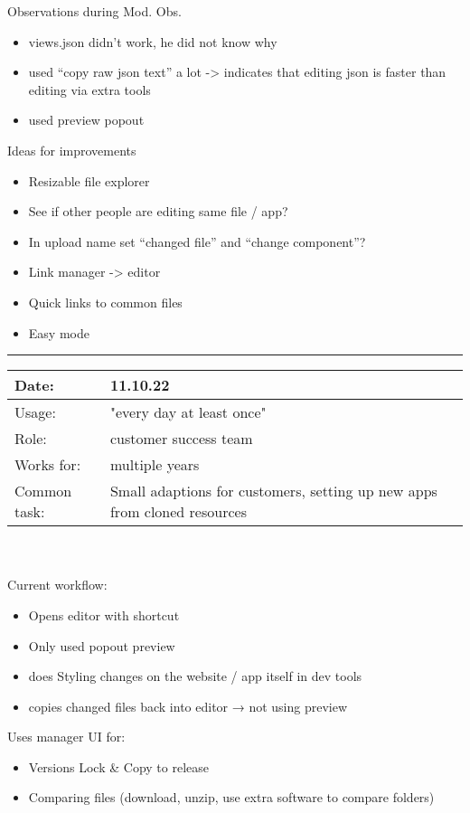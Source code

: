 Observations during Mod. Obs.
\begin{itemize}[nosep]
  \item views.json didn't work, he did not know why
  \item used “copy raw json text” a lot -> indicates that editing json is faster than editing via extra tools
  \item used preview popout
\end{itemize}

Ideas for improvements
\begin{itemize}[nosep]
  \item Resizable file explorer
  \item See if other people are editing same file / app?
  \item In upload name set “changed file” and “change component”?
  \item Link manager -> editor
  \item Quick links to common files
  \item Easy mode
\end{itemize}
\bigskip
\hrule

\begin{tabularx}{\linewidth}{lX}
  Date: & 11.10.22 \\
  \hline
  Usage: & "every day at least once"\\
  \hline
  Role: & customer success team \\
  \hline
  Works for: & multiple years \\
  \hline
  Common task: &  Small adaptions for customers, setting up new apps from cloned resources
\end{tabularx}
\\\\


Current workflow:
\begin{itemize}[nosep]
  \item Opens editor with shortcut
  \item Only used popout preview
  \item does Styling changes on the website / app itself in dev tools
  \item copies changed files back into editor → not using preview
\end{itemize}

Uses manager UI for:
\begin{itemize}[nosep]
  \item Versions Lock \& Copy to release
  \item Comparing files (download, unzip, use extra software to compare folders)
\end{itemize}

